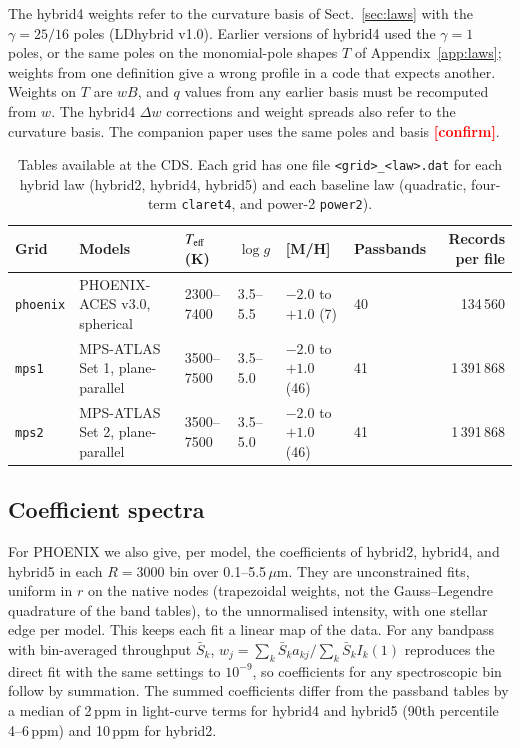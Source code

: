 \documentclass{aa}
\newcommand{\ppm}{\,\textrm{ppm}}
\newcommand{\teff}{T_{\rm eff}}
\newcommand{\tbd}[1]{\textcolor{red}{\textbf{[#1]}}}
\begin{document}
The hybrid4 weights refer to the curvature basis of Sect.~\ref{sec:laws} with
the $\gamma=25/16$ poles (LDhybrid v1.0). Earlier versions of hybrid4 used the
$\gamma=1$ poles, or the same poles on the monomial-pole shapes $T$ of
Appendix~\ref{app:laws}; weights from one definition give a wrong profile in a
code that expects another. Weights on $T$ are $wB$, and $q$ values from any
earlier basis must be recomputed from $w$. The hybrid4 $\Delta w$ corrections
and weight spreads also refer to the curvature basis. The companion paper \citep{squishier} uses the same poles
and basis \tbd{confirm}.

\begin{table}
\caption{Tables available at the CDS. Each grid has one file
\texttt{<grid>\_<law>.dat} for each hybrid law (hybrid2, hybrid4, hybrid5)
and each baseline law (quadratic, four-term \texttt{claret4}, and power-2
\texttt{power2}).}
\label{tab:cds}
\centering
\begin{tabular}{llllllr}
\hline\hline
Grid & Models & $\teff$ (K) & $\log g$ & [M/H] & Passbands & Records per file\\
\hline
\texttt{phoenix} & PHOENIX-ACES v3.0, spherical & 2300--7400 & 3.5--5.5 & $-2.0$ to $+1.0$ (7) & 40 & 134\,560\\
\texttt{mps1} & MPS-ATLAS Set 1, plane-parallel & 3500--7500 & 3.5--5.0 & $-2.0$ to $+1.0$ (46) & 41 & 1\,391\,868\\
\texttt{mps2} & MPS-ATLAS Set 2, plane-parallel & 3500--7500 & 3.5--5.0 & $-2.0$ to $+1.0$ (46) & 41 & 1\,391\,868\\
\hline
\end{tabular}
\end{table}

\subsection{Coefficient spectra}\label{sec:spectra}
For PHOENIX we also give, per model, the coefficients of hybrid2, hybrid4, and
hybrid5 in each $R=3000$ bin over 0.1--5.5\,$\mu$m. They are unconstrained
fits, uniform in $r$ on the native nodes (trapezoidal weights, not the
Gauss--Legendre quadrature of the band tables), to the unnormalised intensity,
with one stellar edge per model. This keeps each fit a linear map of the data. For any bandpass with bin-averaged throughput $\bar
S_k$, $w_j=\sum_k\bar S_k a_{kj}/\sum_k\bar S_k I_k(1)$ reproduces the direct
fit with the same settings to $10^{-9}$, so coefficients for any spectroscopic
bin follow by summation. The summed coefficients differ from the passband
tables by a median of 2\ppm{} in light-curve terms for hybrid4 and hybrid5
(90th percentile 4--6\ppm) and 10\ppm{} for hybrid2.
\end{document}
